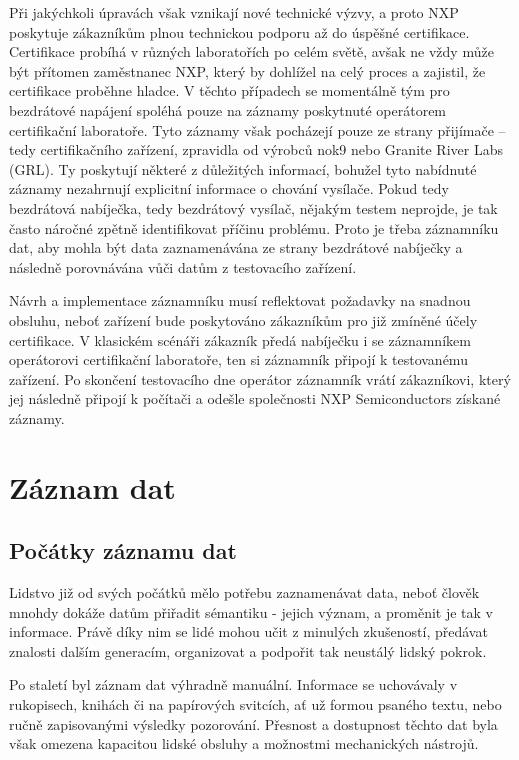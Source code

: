 Při jakýchkoli úpravách však vznikají nové technické výzvy, a proto NXP poskytuje zákazníkům plnou technickou podporu až do úspěšné certifikace. Certifikace probíhá v různých laboratořích po celém světě, avšak ne vždy může být přítomen zaměstnanec NXP, který by dohlížel na celý proces a zajistil, že certifikace proběhne hladce. V těchto případech se momentálně tým pro bezdrátové napájení spoléhá pouze na záznamy poskytnuté operátorem certifikační laboratoře. Tyto záznamy však pocházejí pouze ze strany přijímače – tedy certifikačního zařízení, zpravidla od výrobců nok9 nebo Granite River Labs (GRL). Ty poskytují některé z důležitých informací, bohužel tyto nabídnuté záznamy nezahrnují explicitní informace o chování vysílače. Pokud tedy bezdrátová nabíječka, tedy bezdrátový vysílač, nějakým testem neprojde, je tak často náročné zpětně identifikovat příčinu problému. Proto je třeba záznamníku dat, aby mohla být data zaznamenávána ze strany bezdrátové nabíječky a následně porovnávána vůči datům z testovacího zařízení. \cite{nxp_wireless_charging_team}

Návrh a implementace záznamníku musí reflektovat požadavky na snadnou obsluhu, neboť zařízení bude poskytováno zákazníkům pro již zmíněné účely certifikace. V klasickém scénáři zákazník předá nabíječku i se záznamníkem operátorovi certifikační laboratoře, ten si záznamník připojí k testovanému zařízení. Po skončení testovacího dne operátor záznamník vrátí zákazníkovi, který jej následně připojí k počítači a odešle společnosti NXP Semiconductors získané záznamy.


\chapter{Záznam dat}
\label{zaznam_dat}

\section{Počátky záznamu dat}
\label{pocatky}
Lidstvo již od svých počátků mělo potřebu zaznamenávat data, neboť člověk mnohdy dokáže datům přiřadit sémantiku - jejich význam, a proměnit je tak v informace. Právě díky nim se lidé mohou učit z minulých zkušeností, předávat znalosti dalším generacím, organizovat a podpořit tak neustálý lidský pokrok. 

Po staletí byl záznam dat výhradně manuální. Informace se uchovávaly v rukopisech, knihách či na papírových svitcích, ať už formou psaného textu, nebo ručně zapisovanými výsledky pozorování. Přesnost a dostupnost těchto dat byla však omezena kapacitou lidské obsluhy a možnostmi mechanických nástrojů.


